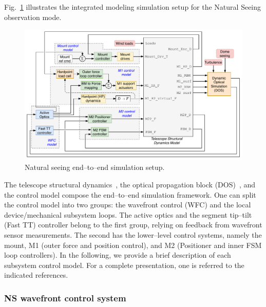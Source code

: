 \documentclass{gmto}
\begin{document}
Fig.~\ref{fig:NS_end2end} illustrates the integrated modeling simulation setup for the Natural Seeing observation mode. %
%
\begin{figure}[!hbt]
    \centering
    \includegraphics[width=\textwidth]{NS_end2end_syslevel.pdf}
    \caption{Natural seeing end--to--end simulation setup.}
    \label{fig:NS_end2end}
\end{figure}
%
 The telescope structural dynamics~\cite{ss2fem_Christoph2020}, the optical propagation block (DOS)~\cite{Conan2017_DOS}, and the control model compose the end--to--end simulation framework. One can split the control model into two groups: the wavefront control (WFC) and the local device/mechanical subsystem loops. The active optics and the segment tip--tilt (Fast TT) controller belong to the first group, relying on feedback from wavefront sensor measurements. The second has the lower--level control systems, namely the mount, M1 (outer force and position control), and M2 (Positioner and inner FSM loop controllers). In the following, we provide a brief description of each subsystem control model. For a complete presentation, one is referred to the indicated references.


\subsubsection{NS wavefront control system}
\label{sec:optics-ctrl}
\end{document}
